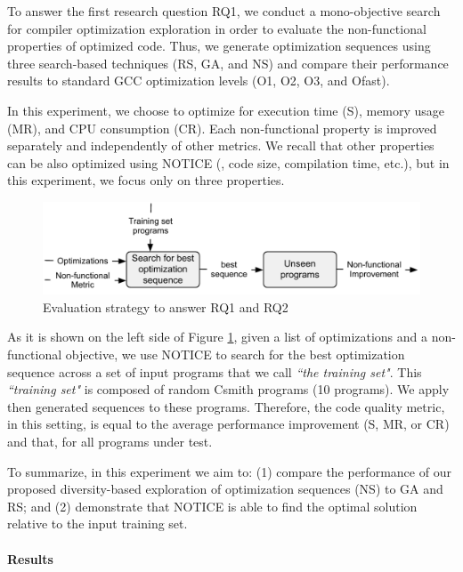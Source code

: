 To answer the first research question RQ1, we conduct a mono-objective search for compiler optimization exploration in order to evaluate the non-functional properties of optimized code. Thus, we generate optimization sequences using three search-based techniques (RS, GA, and NS) and compare their performance results to standard GCC optimization levels (O1, O2, O3, and Ofast). 

In this experiment, we choose to optimize for execution time (S), memory usage (MR), and CPU consumption (CR). Each non-functional property is improved separately and independently of other metrics. We recall that other properties can be also optimized using NOTICE (\eg, code size, compilation time, etc.), but in this experiment, we focus only on three properties.


\begin{figure}[h]
	\centering
	\includegraphics[width=1.\linewidth]{chapitre3/fig/sensitivity.pdf}
	\caption{Evaluation strategy to answer RQ1 and RQ2}
	\label{fig:sensitivity.pdf}
\end{figure}


As it is shown on the left side of Figure \ref{fig:sensitivity.pdf}, given a list of optimizations and a non-functional objective, we use NOTICE to search for the best optimization sequence across a set of input programs that we call \textit{``the training set"}. This \textit{``training set"} is composed of random Csmith programs (10 programs). We apply then generated sequences to these programs. Therefore, the code quality metric, in this setting, is equal to the average performance improvement (S, MR, or CR) and that, for all programs under test. 


To summarize, in this experiment we aim to: (1) compare the performance of our proposed diversity-based exploration of optimization sequences (NS) to GA and RS; and (2) demonstrate that NOTICE is able to find the optimal solution relative to the input training set.

\paragraph{Results}

